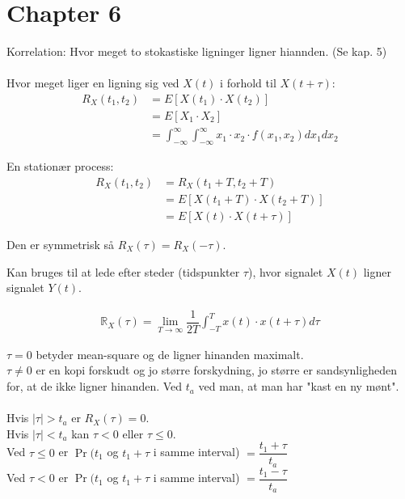 \documentclass[Main]{subfiles}
\begin{document}
\chapter{Chapter 6} %
\label{cha:chapter_6}

\begin{theo}[Autokorrelation]
Korrelation: Hvor meget to stokastiske ligninger ligner hiannden. (Se kap. 5)
\\\\
Hvor meget liger en ligning sig ved $X(t)$ i forhold til $X(t+ \tau)$:
\begin{align*}
	R_X(t_1,t_2) &= E[X(t_1) \cdot X(t_2)] \\
	&= E[X_1 \cdot X_2] \\
	&= \int_{-\infty}^\infty \int_{-\infty}^\infty x_1 \cdot x_2 \cdot f(x_1,x_2) dx_1 dx_2
\end{align*}

En stationær process:\\
\begin{align*}
R_X(t_1,t_2) &= R_X(t_1+T,t_2+T) \\
	&= E[X(t_1+T) \cdot X(t_2+T)] \\
	&= E[X(t) \cdot X(t+ \tau)]
\end{align*}

Den er symmetrisk så $R_X(\tau) = R_X(-\tau)$.
\\

\end{theo}


\begin{theo}[Krydskorrelation]
Kan bruges til at lede efter steder (tidspunkter $\tau$), hvor
signalet $X(t)$ ligner signalet $Y(t)$.
\end{theo}


\begin{theo}
\begin{align*}
\mathbb{R}_X(\tau) = \lim\limits_{T \to \infty} \dfrac{1}{2T} \int_{-T}^T x(t) \cdot x(t+\tau) d\tau
\end{align*}

$\tau = 0 $ betyder mean-square og de ligner hinanden maximalt.
\\
$\tau \not = 0$ er en kopi forskudt og jo større forskydning, jo større er sandsynligheden for, at de ikke ligner hinanden.
Ved $t_a$ ved man, at man har "kast en ny mønt".
\\\\
Hvis $|\tau| > t_a$ er  $R_X(\tau) = 0$.
\\
Hvis $|\tau| < t_a$ kan $\tau < 0 $ eller $\tau \leq 0$.
\\
Ved $\tau \leq 0$ er $\Pr(t_1$ og $t_1+\tau$ i samme interval) $= \dfrac{t_1+\tau}{t_a}$
\\
Ved $\tau < 0$ er $\Pr(t_1$ og $t_1+\tau$ i samme interval) $= \dfrac{t_1-\tau}{t_a}$

\end{theo}
\end{document}
